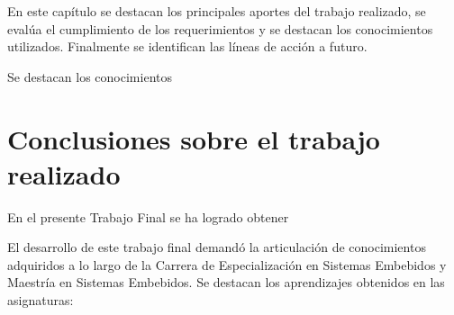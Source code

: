En este capítulo se destacan los principales aportes del trabajo realizado, se evalúa el cumplimiento de los requerimientos y se destacan los conocimientos utilizados. Finalmente se identifican las líneas de acción a futuro.

 Se destacan los conocimientos



\section{Conclusiones sobre el trabajo realizado}




En el presente Trabajo Final se ha logrado obtener 



El desarrollo de este trabajo final demandó la articulación de conocimientos adquiridos a lo largo de la Carrera de Especialización en Sistemas Embebidos y Maestría en Sistemas Embebidos. Se destacan los aprendizajes obtenidos en las asignaturas:

